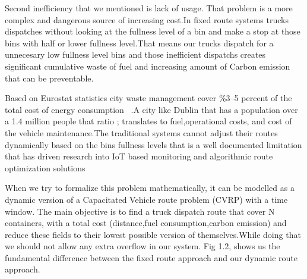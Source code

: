\documentclass[12pt,a4paper]{report}
\begin{document}
\indent Second inefficiency that we mentioned is lack of usage. That problem is a more complex and dangerous source of increasing cost.In fixed route systems trucks dispatches without looking at the fullness level of a bin and make a stop at those bins with half or lower fullness level.That means our trucks dispatch for a unnecesary low fullness level bins  and those inefficient dispatchs creates  significant cumulative waste of fuel and increasing amount of Carbon emission that can be preventable.


\indent Based on Eurostat statistics city waste management cover \%3--5 percent of the total cost of energy consumption ~\cite{eurostat2022}.A city like Dublin that has a population over a 1.4 million people that ratio ; translates to fuel,operational costs, and cost of the vehicle maintenance.The traditional systems cannot adjust their routes dynamically based on the bins fullness levels that is a well documented limitation that has driven research into IoT based monitoring and algorithmic route optimization solutions

\indent When we try to formalize this problem mathematically, it can be modelled as a dynamic version of a Capacitated Vehicle route problem (CVRP) with a time window. The main objective is to find a truck dispatch route that cover N containers, with a total cost (distance,fuel consumption,carbon emission) and reduce these fields to their lowest possible version of themselves.While doing that we should not allow any extra overflow in our system. Fig 1.2, shows us the fundamental difference between the fixed route approach and our dynamic route approach.
\end{document}
